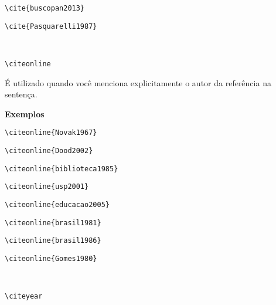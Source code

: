 \begin{alineas}
\begin{verbatim}
\cite{buscopan2013}
\end{verbatim}
\cite{buscopan2013}

\begin{verbatim}
\cite{Pasquarelli1987}
\end{verbatim}
\cite{Pasquarelli1987}\\

\item
\begin{verbatim}
\citeonline
\end{verbatim}

É utilizado quando você menciona explicitamente o autor da referência na sentença.

\textbf{Exemplos}

\begin{verbatim}
\citeonline{Novak1967}
\end{verbatim}

\begin{verbatim}
\citeonline{Dood2002}
\end{verbatim}

\begin{verbatim}
\citeonline{biblioteca1985}
\end{verbatim}

\begin{verbatim}
\citeonline{usp2001}
\end{verbatim}

\begin{verbatim}
\citeonline{educacao2005}
\end{verbatim}

\begin{verbatim}
\citeonline{brasil1981}
\end{verbatim}

\begin{verbatim}
\citeonline{brasil1986}
\end{verbatim}

\begin{verbatim}
\citeonline{Gomes1980}
\end{verbatim}
\\

\item
\begin{verbatim}
\citeyear
\end{verbatim}


\end{alineas}
